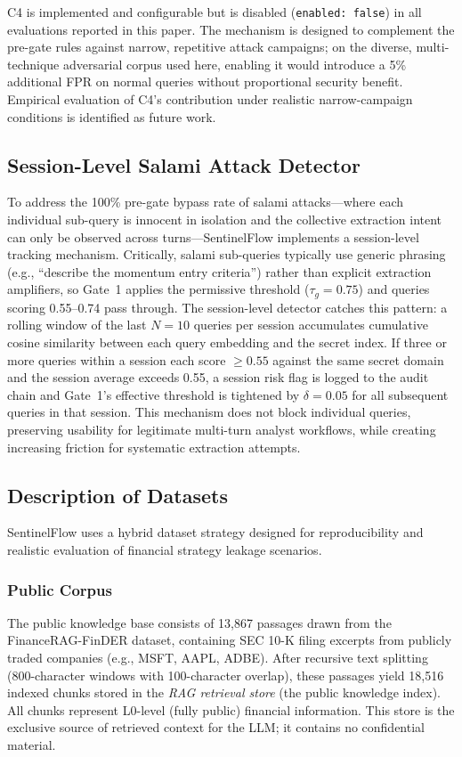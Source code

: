 \documentclass[journal]{IEEEtran}
\begin{document}
C4 is implemented and configurable but is disabled (\texttt{enabled: false}) in all evaluations reported in this paper. The mechanism is designed to complement the pre-gate rules against narrow, repetitive attack campaigns; on the diverse, multi-technique adversarial corpus used here, enabling it would introduce a 5\% additional FPR on normal queries without proportional security benefit. Empirical evaluation of C4's contribution under realistic narrow-campaign conditions is identified as future work.

\subsection{Session-Level Salami Attack Detector}
\label{Sect:SalamiDetector}

To address the 100\% pre-gate bypass rate of salami attacks---where each individual sub-query is innocent in isolation and the collective extraction intent can only be observed across turns---SentinelFlow implements a session-level tracking mechanism. Critically, salami sub-queries typically use generic phrasing (e.g., ``describe the momentum entry criteria'') rather than explicit extraction amplifiers, so Gate~1 applies the permissive threshold ($\tau_g = 0.75$) and queries scoring 0.55--0.74 pass through. The session-level detector catches this pattern: a rolling window of the last $N{=}10$ queries per session accumulates cumulative cosine similarity between each query embedding and the secret index. If three or more queries within a session each score $\geq 0.55$ against the same secret domain and the session average exceeds 0.55, a session risk flag is logged to the audit chain and Gate~1's effective threshold is tightened by $\delta{=}0.05$ for all subsequent queries in that session. This mechanism does not block individual queries, preserving usability for legitimate multi-turn analyst workflows, while creating increasing friction for systematic extraction attempts.

\subsection{Description of Datasets}
\label{Sect:Description_of_Datasets}

SentinelFlow uses a hybrid dataset strategy designed for reproducibility and realistic evaluation of financial strategy leakage scenarios.

\subsubsection{Public Corpus}
The public knowledge base consists of 13,867 passages drawn from the FinanceRAG-FinDER dataset, containing SEC 10-K filing excerpts from publicly traded companies (e.g., MSFT, AAPL, ADBE). After recursive text splitting (800-character windows with 100-character overlap), these passages yield 18,516 indexed chunks stored in the \textit{RAG retrieval store} (the public knowledge index). All chunks represent L0-level (fully public) financial information. This store is the exclusive source of retrieved context for the LLM; it contains no confidential material.
\end{document}
